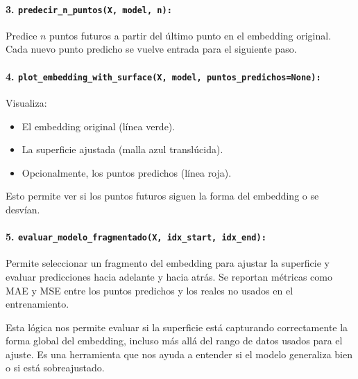 \paragraph{3. \texttt{predecir\_n\_puntos(X, model, n):}} Predice $n$ puntos futuros a partir del último punto en el embedding original. Cada nuevo punto predicho se vuelve entrada para el siguiente paso.

\paragraph{4. \texttt{plot\_embedding\_with\_surface(X, model, puntos\_predichos=None):}} Visualiza:
\begin{itemize}
    \item El embedding original (línea verde).
    \item La superficie ajustada (malla azul translúcida).
    \item Opcionalmente, los puntos predichos (línea roja).
\end{itemize}
Esto permite ver si los puntos futuros siguen la forma del embedding o se desvían.

\paragraph{5. \texttt{evaluar\_modelo\_fragmentado(X, idx\_start, idx\_end):}} Permite seleccionar un fragmento del embedding para ajustar la superficie y evaluar predicciones hacia adelante y hacia atrás. Se reportan métricas como MAE y MSE entre los puntos predichos y los reales no usados en el entrenamiento.

Esta lógica nos permite evaluar si la superficie está capturando correctamente la forma global del embedding, incluso más allá del rango de datos usados para el ajuste. Es una herramienta que nos ayuda a entender si el modelo generaliza bien o si está sobreajustado.
